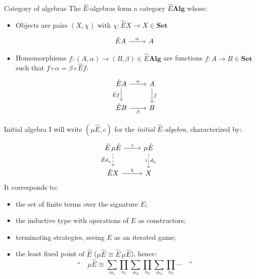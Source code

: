 \documentclass{beamer}
\newcommand{\cat}[1]{\mathbf{#1}}
\begin{document}
\begin{frame}[fragile]{Category of algebras} %
The $\hat{E}$-algebras form a category $\hat{E} \cat{Alg}$
whose:
\begin{itemize}
  \item Objects are pairs $(X, \chi)$ with
    $\chi : \hat{E} X \rightarrow X \in \cat{Set}$
    \[
      \begin{tikzcd}
        \hat{E} A \ar[r, "\alpha"] & A
      \end{tikzcd}
    \]
  \item Homomorphisms
    $f : (A, \alpha) \rightarrow (B, \beta) \in \hat{E} \cat{Alg}$
    are functions $f : A \rightarrow B \in \cat{Set}$ such that
    $f \circ \alpha = \beta \circ \hat{E} f$:
    \[
      \begin{tikzcd}
        \hat{E} A \ar[r, "\alpha"] \ar[d, "\hat{E} f"'] &
        A \ar[d, "f"] \\
        \hat{E} B \ar[r, "\beta"'] &
        B
      \end{tikzcd}
    \]
\end{itemize}
\end{frame}

\begin{frame}[fragile]{Initial algebra} %
I will write $(\mu \hat{E}, c)$ for the \emph{initial $\hat{E}$-algebra},
characterized by:
\[
  \begin{tikzcd}
    \hat{E} \, \mu\hat{E} \ar[r, "c"] \ar[d, "\hat{E} d_\chi"', dashed] &
      \mu \hat{E} \ar[d, "d_\chi", "!"', dashed] \\
    \hat{E} X \ar[r, "\chi"] &
      X
  \end{tikzcd}
\]
\pause
It corresponds to:
\begin{itemize}
  \item the set of finite terms over the signature $E$;
  \item the inductive type with operations of $E$ as constructors;
  \item terminating strategies, seeing $E$ as an iterated game;
  \item the least fixed point of $\hat{E}$
        ($\mu\hat{E} \cong \hat{E}\,\mu\hat{E}$), hence:
    \[
      \text{``} \quad
      \mu \hat{E} \cong
        \sum_{m_1}
        \prod_{n_1}
        \sum_{m_2}
        \prod_{n_2}
        \sum_{m_3}
        \prod_{n_3}
        \cdots
      \quad \text{''}
    \]
\end{itemize}
\end{frame}
\end{document}
